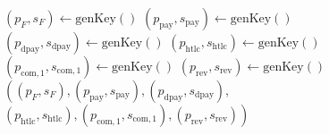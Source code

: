\begin{algorithmic}[1]
     
      \State $\left(p_F, s_F\right) \gets \mathrm{genKey}\left(\right)$
      \State $\left(p_{\mathrm{pay}}, s_{\mathrm{pay}}\right) \gets
      \mathrm{genKey}\left(\right)$ 
      \State $\left(p_{\mathrm{dpay}}, s_{\mathrm{dpay}}\right) \gets
      \mathrm{genKey}\left(\right)$ 
      \State $\left(p_{\mathrm{htlc}}, s_{\mathrm{htlc}}\right) \gets
      \mathrm{genKey}\left(\right)$ 
      \State $\left(p_{\mathrm{com}, 1}, s_{\mathrm{com}, 1}\right) \gets
      \mathrm{genKey}\left(\right)$ 
      \State $\left(p_{\mathrm{rev}}, s_{\mathrm{rev}}\right) \gets
      \mathrm{genKey}\left(\right)$ 
      \State \Return $\left(\left(p_F, s_F\right), \left(p_{\mathrm{pay}},
      s_{\mathrm{pay}}\right), \left(p_{\mathrm{dpay}},
      s_{\mathrm{dpay}}\right),\right.$
      \Indent
        \State $\left.\left(p_{\mathrm{htlc}}, s_{\mathrm{htlc}}\right),
        \left(p_{\mathrm{com}, 1}, s_{\mathrm{com}, 1}\right),
        \left(p_{\mathrm{rev}}, s_{\mathrm{rev}}\right)\right)$
      \EndIndent
    \EndFunction
    \State


\end{algorithmic}
